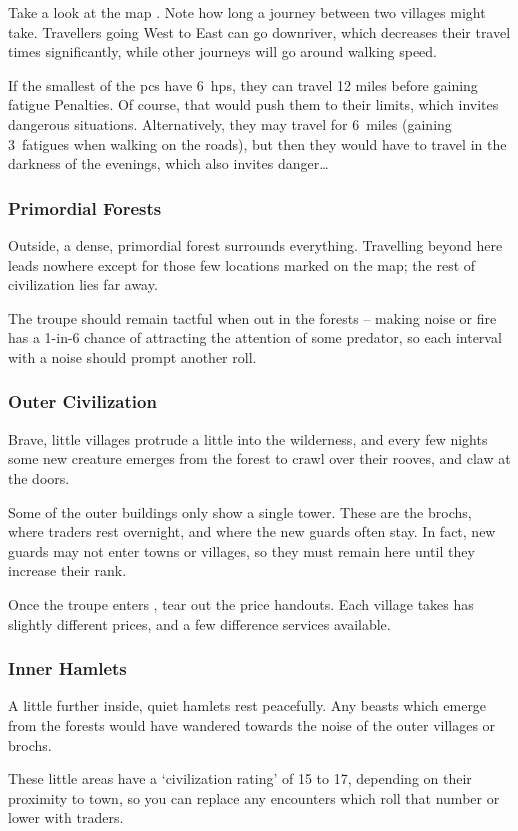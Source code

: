 \begin{multicols}{2}
Take a look at the map .
Note how long a journey between two \glspl{village} might take.
Travellers going West to East can go downriver, which decreases their travel times significantly, while other journeys will go around walking speed.

If the smallest of the \glspl{pc} have 6~\glspl{hp}, they can travel 12 miles before gaining \gls{fatigue} Penalties.
Of course, that would push them to their limits, which invites dangerous situations.
Alternatively, they may travel for 6~miles (gaining 3~\glspl{fatigue} when walking on the roads), but then they would have to travel in the darkness of the evenings, which also invites danger\ldots

\subsubsection{Primordial Forests}
Outside, a dense, primordial forest surrounds everything.
Travelling beyond here leads nowhere except for those few locations marked on the map; the rest of civilization lies far away.

The troupe should remain tactful when out in the forests -- making noise or fire has a 1-in-6 chance of attracting the attention of some predator, so each \gls{interval} with a noise should prompt another roll.

\subsubsection{Outer Civilization}
Brave, little \glspl{village} protrude a little into the wilderness, and every few nights some new creature emerges from the forest to crawl over their rooves, and claw at the doors.

Some of the outer buildings only show a single tower.
These are the \glspl{broch}, where traders rest overnight, and where the new \glspl{guard} often stay.
In fact, new \glspl{guard} may not enter towns or \glspl{village}, so they must remain here until they increase their rank.%

Once the troupe enters , tear out the price handouts.
Each \gls{village} takes has slightly different prices, and a few difference services available.

\subsubsection{Inner Hamlets}
A little further inside, quiet hamlets rest peacefully.
Any beasts which emerge from the forests would have wandered towards the noise of the outer \glspl{village} or \glspl{broch}.

These little areas have a `civilization rating' of 15 to 17, depending on their proximity to town, so you can replace any encounters which roll that number or lower with traders.%

\end{multicols}

